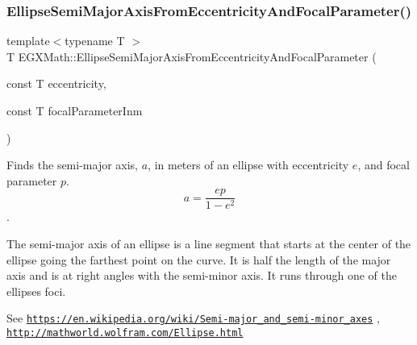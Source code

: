 \mbox{\label{group___e_g_x_math-_geometry-2_d-_ellipse-_semi_major_axis_ga77845ca288672da90567f533679e7024}} 
\subsubsection{\texorpdfstring{Ellipse\+Semi\+Major\+Axis\+From\+Eccentricity\+And\+Focal\+Parameter()}{EllipseSemiMajorAxisFromEccentricityAndFocalParameter()}}
{\footnotesize\ttfamily template$<$typename T $>$ \\
T E\+G\+X\+Math\+::\+Ellipse\+Semi\+Major\+Axis\+From\+Eccentricity\+And\+Focal\+Parameter (\begin{DoxyParamCaption}\item[{const T}]{eccentricity,  }\item[{const T}]{focal\+Parameter\+Inm }\end{DoxyParamCaption})}



Finds the semi-\/major axis, $a$, in meters of an ellipse with eccentricity $e$, and focal parameter $p$. \[ a=\dfrac{ep}{1-e^2} \]. 

The semi-\/major axis of an ellipse is a line segment that starts at the center of the ellipse going the farthest point on the curve. It is half the length of the major axis and is at right angles with the semi-\/minor axis. It runs through one of the ellipses foci.

See \href{https://en.wikipedia.org/wiki/Semi-major_and_semi-minor_axes}{\tt https\+://en.\+wikipedia.\+org/wiki/\+Semi-\/major\+\_\+and\+\_\+semi-\/minor\+\_\+axes} , \href{http://mathworld.wolfram.com/Ellipse.html}{\tt http\+://mathworld.\+wolfram.\+com/\+Ellipse.\+html}


